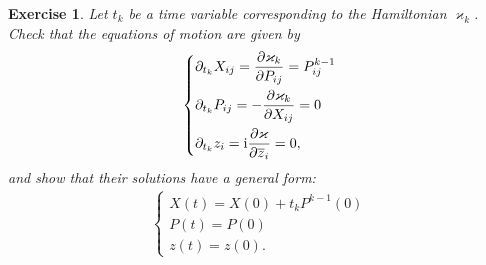 \documentclass[12pt]{article}
\newtheorem{exer}{Exercise}[section]
\numberwithin{equation}{section}
\theoremstyle{definition}
\newcommand {\ii} {\mathrm{i}}
\begin{document}
 \begin{exer}\normalfont
     Let $t_{k}$ be a time variable corresponding to the Hamiltonian $\varkappa_{k}$. Check that the equations of motion are given by
\begin{align*}
    \begin{dcases}
        \partial_{t_{k}}X_{ij} = \frac{\partial \varkappa_k}{\partial P_{ij}} = P_{ij}^{k-1}\\
        \partial_{t_k}P_{ij} = -\frac{\partial \varkappa_k}{\partial X_{ij}} = 0\\
        \partial_{t_k} z_{i} = {\ii}\frac{\partial \varkappa}{\partial \overline{z}_{i}} = 0,
    \end{dcases}
\end{align*}
and show that their solutions have a general form:
     \begin{align}\label{LEOM}
     \begin{cases}
         X(t) = X(0) + t_k P^{k - 1}(0)\\
         P(t) = P(0)\\
         z(t) = z(0).
     \end{cases}
     \end{align}
 \end{exer}
\end{document}
